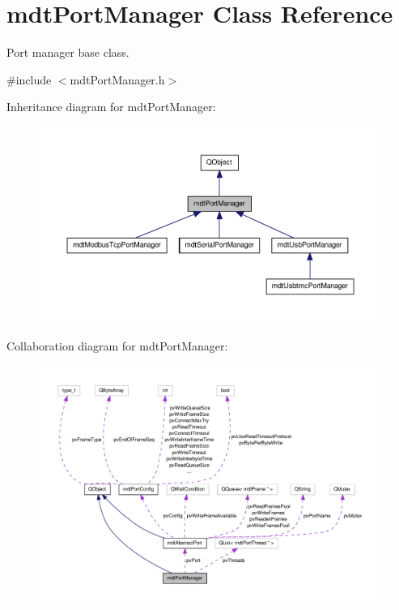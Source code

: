 \hypertarget{classmdt_port_manager}{\section{mdt\-Port\-Manager Class Reference}
\label{classmdt_port_manager}
}


Port manager base class.  




{\ttfamily \#include $<$mdt\-Port\-Manager.\-h$>$}



Inheritance diagram for mdt\-Port\-Manager\-:\nopagebreak
\begin{figure}[H]
\begin{center}
\leavevmode
\includegraphics[width=350pt]{classmdt_port_manager__inherit__graph}
\end{center}
\end{figure}


Collaboration diagram for mdt\-Port\-Manager\-:\nopagebreak
\begin{figure}[H]
\begin{center}
\leavevmode
\includegraphics[width=350pt]{classmdt_port_manager__coll__graph}
\end{center}
\end{figure}
